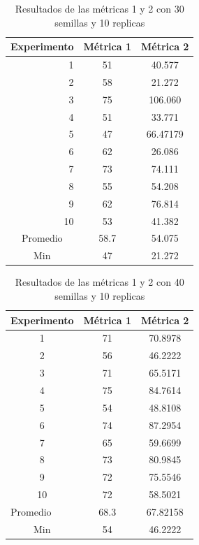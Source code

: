 \documentclass{article}
\begin{document}
\begin{center}
\begin{table}[htbp]
	\centering
	\caption{Resultados  de las métricas 1 y 2 con 30 semillas  y 10 replicas}
	\begin{tabular}{|c|c|c|}
		\hline
		Experimento  & \multicolumn{1}{l|}{Métrica 1} & \multicolumn{1}{l|}{Métrica 2} \\
		\hline
		\multicolumn{1}{|r|}{1} & 51    & 40.577 \\
		\hline
		\multicolumn{1}{|r|}{2} & 58    & \cellcolor[rgb]{ .663,  .816,  .557}21.272 \\
			\hline
		\multicolumn{1}{|r|}{3} & 75    & 106.060 \\
			\hline
		\multicolumn{1}{|r|}{4} & 51    & 33.771 \\
		\hline
		\multicolumn{1}{|r|}{5} & \cellcolor[rgb]{ .663,  .816,  .557}47 & 66.47179 \\
			\hline
		\multicolumn{1}{|r|}{6} & 62    & 26.086 \\
			\hline
		\multicolumn{1}{|r|}{7} & 73    & 74.111 \\
			\hline
		\multicolumn{1}{|r|}{8} & 55    & 54.208 \\
			\hline
		\multicolumn{1}{|r|}{9} & 62    & 76.814 \\
			\hline
		\multicolumn{1}{|r|}{10} & 53    & 41.382 \\
			\hline
		Promedio & 58.7  & 54.075 \\
			\hline
		Min   & 47    & 21.272 \\
			\hline
	\end{tabular}%
	\label{tab:cuadro2}%
\end{table}%

\begin{table}[htbp]
	\centering
	\caption{Resultados  de las métricas 1 y 2 con 40 semillas  y 10 replicas}
	\begin{tabular}{|c|c|c|}
		\hline
		\multicolumn{1}{|l|}{Experimento } & \multicolumn{1}{l|}{Métrica 1} & \multicolumn{1}{p{5.39em}|}{Métrica 2} \\
		\hline
		1     & 71    & 70.8978 \\
		\hline
		2     & 56    & \cellcolor[rgb]{ .663,  .816,  .557}46.2222 \\
		\hline
		3     & 71    & 65.5171 \\
		\hline
		4     & 75    & 84.7614 \\
		\hline
		5     & \cellcolor[rgb]{ .663,  .816,  .557}54 & 48.8108 \\
		\hline
		6     & 74    & 87.2954 \\
		\hline
		7     & 65    & 59.6699 \\
		\hline
		8     & 73    & 80.9845 \\
		\hline
		9     & 72    & 75.5546 \\
		\hline
		10    & 72    & 58.5021 \\
		\hline
		\multicolumn{1}{|l|}{Promedio} & 68.3  & 67.82158 \\
		\hline
		Min & 54    & 46.2222 \\
		\hline
	\end{tabular}%
	\label{tab:addlabel}%
\end{table}%


\end{center}
\end{document}
